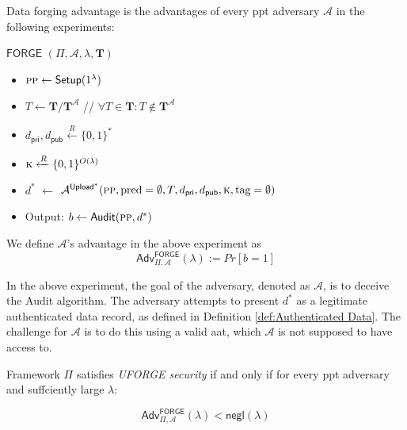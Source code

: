 \begin{definition}
            \label{def:Data forging advantage}
            Data forging advantage is the advantages of every \gls{ppt} adversary $\mathcal{A}$ in the following experiments:

            $\mathsf{FORGE}$  $(\Pi, \mathcal{A}, \lambda, \mathbf{T})$%
        \begin{itemize}
                \item [] $\textsc{pp} \leftarrow \textsf{Setup}(1^\lambda)$ 

                \item [] $T \leftarrow \mathbf{T}/\mathbf{T}^\mathcal{A} $   {\color{gray} // $\forall T \in \mathbf{T} : T \notin \mathbf{T}^\mathcal{A}$}
                
                \item[] $d_\mathsf{pri}, d_\mathsf{pub} \xleftarrow{R} \{0,1\}^\ast$
                \item[] $\textsc{k} \xleftarrow{R} \{0,1\}^{O(\lambda)}$                
                \item[] $d^\ast$ $\leftarrow$ $\mathcal{A}^{\mathsf{Upload}^*}(\textsc{pp}, \text{pred} = \emptyset , T, d_\mathsf{pri}, d_\mathsf{pub}, \textsc{k}, \text{tag} = \emptyset)$

                \item[] Output: $b \leftarrow \mathsf{Audit}(\textsc{pp}, d^\ast)$
        \end{itemize}
We define $\mathcal{A}$'s advantage in the above experiment as
\begin{equation}
\label{eq:Adv_FORGE}
    \mathsf{Adv}^{\mathsf{FORGE}}_{\Pi, \mathcal{A}}(\lambda) := Pr[b=1]
\end{equation}
            \end{definition}

In the above experiment, the goal of the adversary, denoted as $\mathcal{A}$, is to deceive the \textsf{Audit} algorithm. The adversary attempts to present $d^\ast$ as a legitimate authenticated data record, as defined in Definition \ref{def:Authenticated Data}. The challenge for $\mathcal{A}$ is to do this using a valid \gls{aat}, which $\mathcal{A}$ is not supposed to have access to.

\begin{definition}
    \label{def:UFORGE}
    Framework $\Pi$ satisfies \textit{\textsf{UFORGE} security}  if and only if for every \gls{ppt} adversary and suffciently large $\lambda$:

    \begin{equation*}
        \mathsf{Adv}^{\mathsf{FORGE}}_{\Pi, \mathcal{A}}(\lambda) < \mathsf{negl}(\lambda)
    \end{equation*}
\end{definition}

